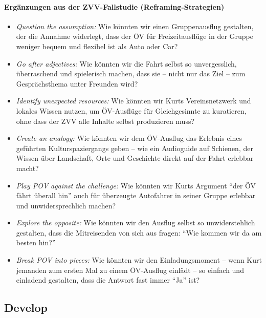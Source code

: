 \paragraph{Ergänzungen aus der ZVV-Fallstudie (Reframing-Strategien)}
\begin{itemize}[nosep]
  \item \emph{Question the assumption:} Wie könnten wir einen Gruppenausflug gestalten, der die Annahme widerlegt, dass der ÖV für Freizeitausflüge in der Gruppe weniger bequem und flexibel ist als Auto oder Car?
  \item \emph{Go after adjectives:} Wie könnten wir die Fahrt selbst so unvergesslich, überraschend und spielerisch machen, dass sie -- nicht nur das Ziel -- zum Gesprächsthema unter Freunden wird?
  \item \emph{Identify unexpected resources:} Wie könnten wir Kurts Vereinsnetzwerk und lokales Wissen nutzen, um ÖV-Ausflüge für Gleichgesinnte zu kuratieren, ohne dass der ZVV alle Inhalte selbst produzieren muss?
  \item \emph{Create an analogy:} Wie könnten wir dem ÖV-Ausflug das Erlebnis eines geführten Kulturspaziergangs geben -- wie ein Audioguide auf Schienen, der Wissen über Landschaft, Orte und Geschichte direkt auf der Fahrt erlebbar macht?
  \item \emph{Play POV against the challenge:} Wie könnten wir Kurts Argument \enquote{der ÖV fährt überall hin} auch für überzeugte Autofahrer in seiner Gruppe erlebbar und unwidersprechlich machen?
  \item \emph{Explore the opposite:} Wie könnten wir den Ausflug selbst so unwiderstehlich gestalten, dass die Mitreisenden von sich aus fragen: \enquote{Wie kommen wir da am besten hin?}
  \item \emph{Break POV into pieces:} Wie könnten wir den Einladungsmoment -- wenn Kurt jemanden zum ersten Mal zu einem ÖV-Ausflug einlädt -- so einfach und einladend gestalten, dass die Antwort fast immer \enquote{Ja} ist?
\end{itemize}

\clearpage
\pagecolor{anhangPastel}
\subsection{Develop}

\clearpage
{}
\clearpage
{}
\clearpage
{}

